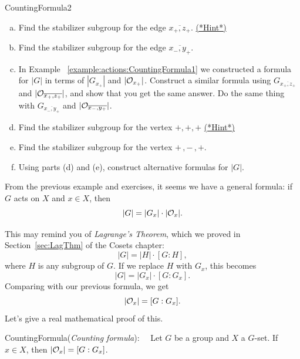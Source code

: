 \begin{exercise}{CountingFormula2}
\begin{enumerate}[(a)]
\item Find the stabilizer subgroup for the edge $\overline{x_+,z_+}$. 
\hyperref[sec:actions:hints]{(*Hint*)}
\item Find the stabilizer subgroup for the edge $\overline{x_-,y_+}$.
\item In Example ~\ref{example:actions:CountingFormula1} we constructed a formula for $|G|$ in terms of $| G_{x_+}|$ and $|{\cal O}_{x_+}|$.  Construct a similar formula using $G_{\overline{x_+,z_+}}$ and $|{\cal O}_{\overline{x_+,z_+}}|$, and show that you get the same answer. Do the same thing with $G_{\overline{x_-,y_+}}$ and $|{\cal O}_{\overline{x_-,y_+}}|$.  
\item Find the stabilizer subgroup for the vertex $+,+,+$ 
\hyperref[sec:actions:hints]{(*Hint*)}
\item Find the stabilizer subgroup for the vertex $+\,,-\,,+$. 
\item Using parts (d) and (e), construct alternative formulas for $|G|$.
\end{enumerate}
\end{exercise}

From the previous example and exercises, it seems we have a general formula:  if $G$ acts on $X$ and $x\in X$, then 
$$|G|=|G_x|\cdot|{\cal O}_x|.$$

This may remind you of \emph{Lagrange's Theorem}, which we proved in Section~\ref{sec:LagThm} of the Cosets chapter:  
$$|G|=|H|\cdot [G:H], $$
where $H$ is any subgroup of $G$.  If we replace $H$ with $G_x$, this becomes $$|G|=|G_x|\cdot [G:G_x]. $$
Comparing with our previous formula, we get
 $$|{\cal O}_x|=[G:G_x].$$
Let's give a real mathematical proof of this.

\begin{prop}{CountingFormula}(\emph{Counting formula}):~~
Let $G$ be a group and $X$ a $G$-set. If $x\in X$,
then $|{\cal O}_x| = [G:G_x]$. 
\end{prop}

